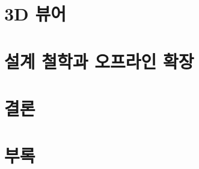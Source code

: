 \documentclass[11pt]{article}
\begin{document}
\part{3D 뷰어}


\part{설계 철학과 오프라인 확장}


\part{결론}


\appendix
\part{부록}

\end{document}
